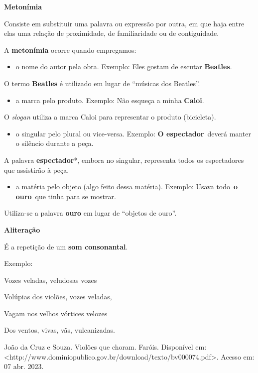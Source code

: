 \begin{itemize}
\begin{itemize}
{\begin{itemize}
\begin{itemize}
{\textbf{Metonímia}

Consiste em substituir uma palavra ou expressão por outra, em que haja
entre elas uma relação de proximidade, de familiaridade ou de
contiguidade.

A \textbf{metonímia} ocorre quando empregamos:

\begin{itemize}
\tightlist
\item
  o nome do autor pela obra. Exemplo: Eles gostam de escutar
  \textbf{Beatles}.
\end{itemize}

O termo \textbf{Beatles} é utilizado em lugar de ``músicas dos
Beatles''.

\begin{itemize}
\tightlist
\item
  a marca pelo produto. Exemplo: Não esqueça a minha \textbf{Caloi}.
\end{itemize}

O \emph{slogan} utiliza a marca Caloi para representar o produto
(bicicleta).

\begin{itemize}
\tightlist
\item
  o singular pelo plural ou vice-versa. Exemplo: \textbf{O
  espectador}~deverá manter o silêncio durante a peça.
\end{itemize}

A palavra \textbf{espectador}*, embora no singular, representa todos os
espectadores que assistirão à peça.

\begin{itemize}
\tightlist
\item
  a matéria pelo objeto (algo feito dessa matéria). Exemplo: Usava
  todo~\textbf{o ouro}~que tinha para se mostrar.
\end{itemize}

Utiliza-se a palavra \textbf{ouro} em lugar de ``objetos de ouro''.

\textbf{Aliteração}

É a repetição de um \textbf{som consonantal}.

Exemplo:

Vozes veladas, veludosas vozes

Volúpias dos violões, vozes veladas,

Vagam nos velhos vórtices velozes

Dos ventos, vivas, vãs, vulcanizadas.

João da Cruz e Souza. Violões que choram. Faróis. Disponível em:
\textless{}http://www.dominiopublico.gov.br/download/texto/bv000074.pdf\textgreater{}.
Acesso em: 07 abr. 2023.

}
\end{itemize}
\end{itemize}}
\end{itemize}
\end{itemize}
